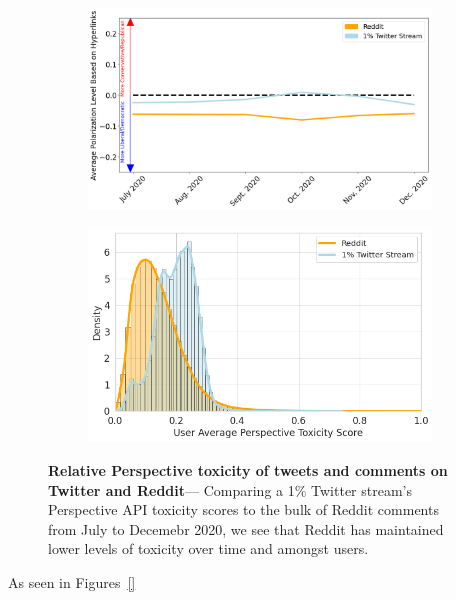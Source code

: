 \begin{figure}
\begin{subfigure}{.48\textwidth}
  \centering
  \includegraphics[width=1\linewidth]{figures/polarization_redidit_twitter.png}
\label{fig:cdf-subreddit-hyperlinks}
\end{subfigure}%
\begin{subfigure}{.48\textwidth}
  \centering
  \includegraphics[width=1\linewidth]{figures/average-toxicity-distribution-end2020.png}
 \label{fig:cdf-user-hyperlinks}
\end{subfigure}
\label{fig:cdf-hyperlinsk}
\caption{\textbf{Relative Perspective toxicity of tweets and comments on Twitter and Reddit}--- Comparing a 1\% Twitter stream's Perspective API toxicity scores to the bulk of Reddit comments from  July to Decemebr 2020, we see that Reddit has maintained lower levels of toxicity over time and amongst users. }
\end{figure}
As seen in Figures~\ref{}

